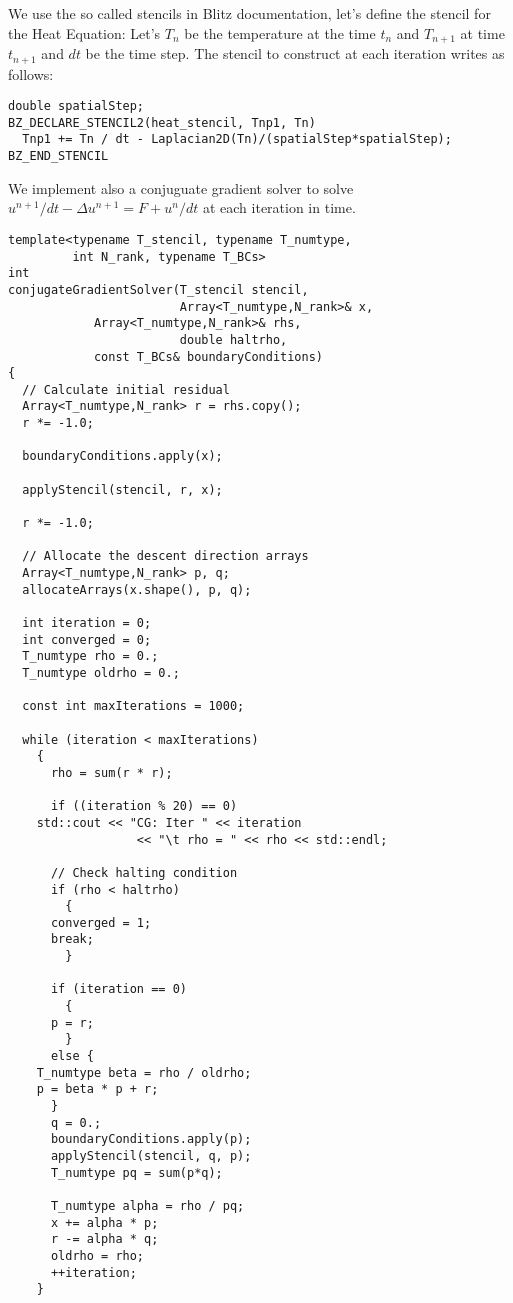 \documentclass{article}
\begin{document}
\begin{Answer}
  We use the so called stencils in Blitz documentation, let's define
  the stencil for the Heat Equation: Let's $T_n$ be the temperature at
  the time $t_n$ and $T_{n+1}$ at time $t_{n+1}$ and $dt$ be the time
  step. The stencil to construct at each iteration writes as follows:
\begin{lstlisting}
double spatialStep; 
BZ_DECLARE_STENCIL2(heat_stencil, Tnp1, Tn)
  Tnp1 += Tn / dt - Laplacian2D(Tn)/(spatialStep*spatialStep);
BZ_END_STENCIL
\end{lstlisting}

  We implement also a conjuguate gradient solver to solve $u^{n+1}/dt
  - \Delta u^{n+1} = F + u^n/dt$ at each iteration in time.
\begin{lstlisting}
template<typename T_stencil, typename T_numtype, 
         int N_rank, typename T_BCs>
int 
conjugateGradientSolver(T_stencil stencil,
                        Array<T_numtype,N_rank>& x,
			Array<T_numtype,N_rank>& rhs, 
                        double haltrho,
			const T_BCs& boundaryConditions)
{
  // Calculate initial residual
  Array<T_numtype,N_rank> r = rhs.copy();
  r *= -1.0;

  boundaryConditions.apply(x);

  applyStencil(stencil, r, x);

  r *= -1.0;

  // Allocate the descent direction arrays
  Array<T_numtype,N_rank> p, q;
  allocateArrays(x.shape(), p, q);

  int iteration = 0;
  int converged = 0;
  T_numtype rho = 0.;
  T_numtype oldrho = 0.;

  const int maxIterations = 1000;

  while (iteration < maxIterations)
    {
      rho = sum(r * r);

      if ((iteration % 20) == 0)
	std::cout << "CG: Iter " << iteration 
                  << "\t rho = " << rho << std::endl;

      // Check halting condition
      if (rho < haltrho)
        {
	  converged = 1;
	  break;
        }

      if (iteration == 0)
        {
	  p = r;
        }
      else {
	T_numtype beta = rho / oldrho;
	p = beta * p + r;
      }
      q = 0.;
      boundaryConditions.apply(p);
      applyStencil(stencil, q, p);
      T_numtype pq = sum(p*q);

      T_numtype alpha = rho / pq;
      x += alpha * p;
      r -= alpha * q;
      oldrho = rho;
      ++iteration;
    }


\end{lstlisting}
\end{Answer}
\end{document}
